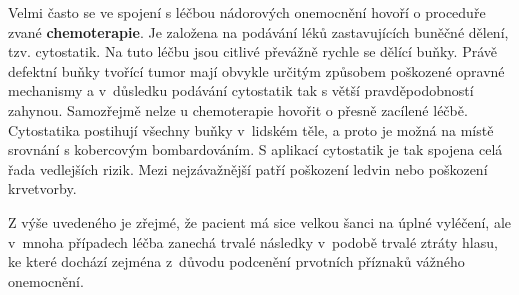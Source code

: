 Velmi často se ve spojení s léčbou nádorových onemocnění hovoří o proceduře zvané
\textbf{chemoterapie}. Je založena na podávání léků zastavujících buněčné
dělení, tzv. cytostatik. %
Na tuto léčbu jsou citlivé převážně rychle se dělící buňky.
Právě defektní buňky tvořící tumor mají obvykle určitým způsobem poškozené opravné
mechanismy a v~důsledku podávání cytostatik tak s větší pravděpodobností
zahynou. Samozřejmě nelze u chemoterapie hovořit o přesně zacílené léčbě.
Cytostatika postihují všechny buňky v~lidském těle, a proto je možná na místě
srovnání s kobercovým bombardováním. S aplikací cytostatik je tak
spojena celá řada vedlejších rizik. Mezi nejzávažnější patří poškození ledvin
nebo poškození krvetvorby.


Z výše uvedeného je zřejmé, že pacient má sice velkou šanci na úplné
vyléčení, ale v~mnoha případech léčba zanechá trvalé následky v~podobě trvalé ztráty
hlasu, ke které dochází zejména z~důvodu podcenění prvotních příznaků vážného onemocnění.


